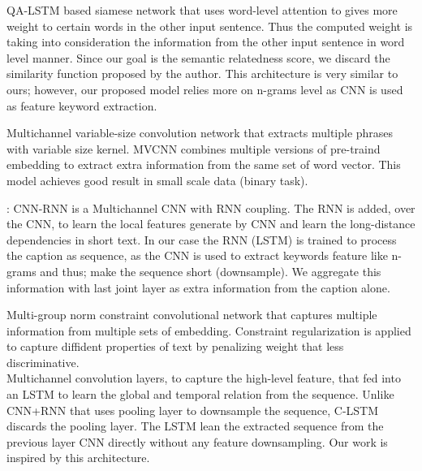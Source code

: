 \documentclass[phd,tocprelim]{cornell}
\begin{document}
 \citep{Ming:16}  QA-LSTM based siamese network that uses word-level attention to gives more weight to certain words in the other input sentence. Thus the computed weight is taking into consideration the information from the other input sentence in word level manner.  Since our goal is the semantic relatedness score, we discard the similarity function proposed by the author. This architecture is very similar to ours; however, our proposed model relies more on n-grams level as CNN is used as feature keyword extraction.       

 \citep{Wenpeng:16} Multichannel variable-size convolution network that extracts multiple phrases with variable size kernel. MVCNN combines multiple versions of pre-traind embedding to extract extra information from the same set of word vector. This model achieves good result in small scale data (binary task). 


: \citep{Xingyou:16}  CNN-RNN is a Multichannel CNN with RNN coupling. The RNN is added, over the CNN, to learn the local features generate by CNN and learn the long-distance dependencies in short text. In our case the RNN (LSTM) \citep{Sepp:97} is trained to process the caption as sequence, as the CNN  is used to extract keywords feature like n-grams and thus; make the sequence short (downsample). We aggregate this information with last joint layer as extra information from the caption alone.     

 \citep{Ye:16} Multi-group norm constraint convolutional network that captures multiple information from multiple sets of embedding. Constraint regularization is applied to capture diffident properties of text by penalizing weight that less discriminative.  \\ 

 \citep{Chunting:15} Multichannel convolution layers, to capture the high-level feature, that fed into an LSTM to learn the global and temporal relation from the sequence. Unlike CNN+RNN that uses pooling layer to downsample the sequence, C-LSTM discards the pooling layer. The LSTM lean the extracted sequence from the previous layer CNN directly without any feature downsampling. Our work is inspired by this architecture.  
\end{document}
